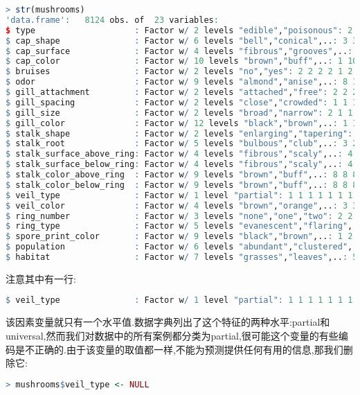 \documentclass[11pt,a4paper,oneside]{book}
\begin{document}
\begin{lstlisting}[language=r]
> str(mushrooms)
'data.frame':	8124 obs. of  23 variables:
$ type                    : Factor w/ 2 levels "edible","poisonous": 2 1 1 2 1 1 1 1 2 1 ...
$ cap_shape               : Factor w/ 6 levels "bell","conical",..: 3 3 1 3 3 3 1 1 3 1 ...
$ cap_surface             : Factor w/ 4 levels "fibrous","grooves",..: 4 4 4 3 4 3 4 3 3 4 ...
$ cap_color               : Factor w/ 10 levels "brown","buff",..: 1 10 9 9 4 10 9 9 9 10 ...
$ bruises                 : Factor w/ 2 levels "no","yes": 2 2 2 2 1 2 2 2 2 2 ...
$ odor                    : Factor w/ 9 levels "almond","anise",..: 8 1 2 8 7 1 1 2 8 1 ...
$ gill_attachment         : Factor w/ 2 levels "attached","free": 2 2 2 2 2 2 2 2 2 2 ...
$ gill_spacing            : Factor w/ 2 levels "close","crowded": 1 1 1 1 2 1 1 1 1 1 ...
$ gill_size               : Factor w/ 2 levels "broad","narrow": 2 1 1 2 1 1 1 1 2 1 ...
$ gill_color              : Factor w/ 12 levels "black","brown",..: 1 1 2 2 1 2 5 2 8 5 ...
$ stalk_shape             : Factor w/ 2 levels "enlarging","tapering": 1 1 1 1 2 1 1 1 1 1 ...
$ stalk_root              : Factor w/ 5 levels "bulbous","club",..: 3 2 2 3 3 2 2 2 3 2 ...
$ stalk_surface_above_ring: Factor w/ 4 levels "fibrous","scaly",..: 4 4 4 4 4 4 4 4 4 4 ...
$ stalk_surface_below_ring: Factor w/ 4 levels "fibrous","scaly",..: 4 4 4 4 4 4 4 4 4 4 ...
$ stalk_color_above_ring  : Factor w/ 9 levels "brown","buff",..: 8 8 8 8 8 8 8 8 8 8 ...
$ stalk_color_below_ring  : Factor w/ 9 levels "brown","buff",..: 8 8 8 8 8 8 8 8 8 8 ...
$ veil_type               : Factor w/ 1 level "partial": 1 1 1 1 1 1 1 1 1 1 ...
$ veil_color              : Factor w/ 4 levels "brown","orange",..: 3 3 3 3 3 3 3 3 3 3 ...
$ ring_number             : Factor w/ 3 levels "none","one","two": 2 2 2 2 2 2 2 2 2 2 ...
$ ring_type               : Factor w/ 5 levels "evanescent","flaring",..: 5 5 5 5 1 5 5 5 5 5 ...
$ spore_print_color       : Factor w/ 9 levels "black","brown",..: 1 2 2 1 2 1 1 2 1 1 ...
$ population              : Factor w/ 6 levels "abundant","clustered",..: 4 3 3 4 1 3 3 4 5 4 ...
$ habitat                 : Factor w/ 7 levels "grasses","leaves",..: 5 1 3 5 1 1 3 3 1 3 ...
\end{lstlisting}
注意其中有一行:
\begin{lstlisting}[language=r]
$ veil_type               : Factor w/ 1 level "partial": 1 1 1 1 1 1 1 1 1 1 ...
\end{lstlisting}
该因素变量就只有一个水平值.数据字典列出了这个特征的两种水平:partial和universal,然而我们对数据中的所有案例都分类为partial,很可能这个变量的有些编码是不正确的.由于该变量的取值都一样,不能为预测提供任何有用的信息,那我们删除它:
\begin{lstlisting}[language=r]
> mushrooms$veil_type <- NULL
\end{lstlisting}
\end{document}
